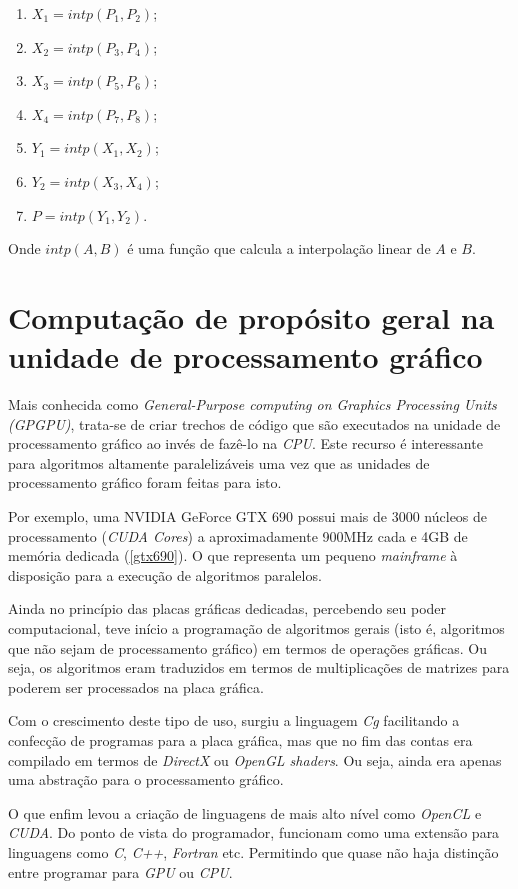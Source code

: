     \newpage
    \begin{enumerate}
      \item $X_{1} = intp(P_{1}, P_{2})$;
      \item $X_{2} = intp(P_{3}, P_{4})$;
      \item $X_{3} = intp(P_{5}, P_{6})$;
      \item $X_{4} = intp(P_{7}, P_{8})$;
      \item $Y_{1} = intp(X_{1}, X_{2})$;
      \item $Y_{2} = intp(X_{3}, X_{4})$;
      \item $P = intp(Y_{1}, Y_{2})$.
    \end{enumerate}
    
    Onde $intp(A,B)$ é uma função que calcula a interpolação linear de $A$ e $B$.

\section{Computação de propósito geral na unidade de processamento gráfico}
\label{gpgpu}
Mais conhecida como \textit{General-Purpose computing on Graphics Processing Units (GPGPU)}, trata-se de  criar trechos de código que são executados na unidade de processamento gráfico ao invés de fazê-lo na \textit{CPU}. Este recurso é interessante para algoritmos altamente paralelizáveis uma vez que as unidades de processamento gráfico foram feitas para isto.

Por exemplo, uma NVIDIA GeForce GTX 690 possui mais de 3000 núcleos de processamento (\textit{CUDA Cores}) a aproximadamente 900MHz cada e 4GB de memória dedicada (\ref{gtx690}). O que representa um pequeno \textit{mainframe} à disposição para a execução de algoritmos paralelos. 

Ainda no princípio das placas gráficas dedicadas, percebendo seu poder computacional, teve início a programação de algoritmos gerais (isto é, algoritmos que não sejam de processamento gráfico) em termos de operações gráficas. Ou seja, os algoritmos eram traduzidos em termos de multiplicações de matrizes para poderem ser processados na placa gráfica.

Com o crescimento deste tipo de uso, surgiu a linguagem \textit{Cg} facilitando a confecção de programas para a placa gráfica, mas que no fim das contas era compilado em termos de \textit{DirectX} ou \textit{OpenGL shaders}. Ou seja, ainda era apenas uma abstração para o processamento gráfico.

O que enfim levou a criação de linguagens de mais alto nível como \textit{OpenCL} e \textit{CUDA}. Do ponto de vista do programador, funcionam como uma extensão para linguagens como \textit{C}, \textit{C++}, \textit{Fortran} etc. Permitindo que quase não haja distinção entre programar para \textit{GPU} ou \textit{CPU}.

